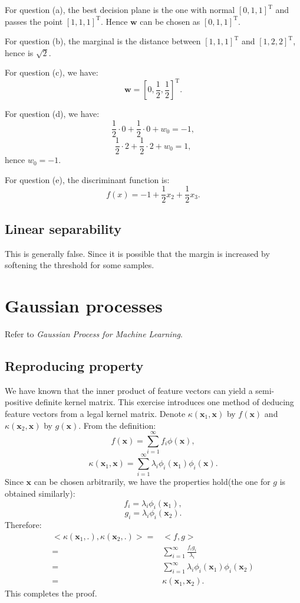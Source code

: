 \documentclass[UTF8]{ctexart}
\begin{document}
For question (a), the best decision plane is the one with normal $[0,1,1]^{\text{T}}$ and passes the point $[1,1,1]^{\text{T}}$.
Hence $\textbf{w}$ can be chosen as $[0,1,1]^{\text{T}}$.

For question (b), the marginal is the distance between $[1,1,1]^{\text{T}}$ and $[1,2,2]^{\text{T}}$, hence is $\sqrt{2}$.

For question (c), we have:
$$\textbf{w}=[0,\frac{1}{2},\frac{1}{2}]^{\text{T}}.$$

For question (d), we have:
$$\frac{1}{2}\cdot 0+\frac{1}{2}\cdot 0+w_{0}=-1,$$
$$\frac{1}{2}\cdot 2+\frac{1}{2}\cdot 2+w_{0}=1,$$
hence $w_{0}=-1$.

For question (e), the discriminant function is:
$$f(x)=-1+\frac{1}{2}x_{2}+\frac{1}{2}x_{3}.$$

\subsection{Linear separability}
This is generally false.
Since it is possible that the margin is increased by softening the threshold for some samples. 

\newpage
\section{Gaussian processes}
Refer to \emph{Gaussian Process for Machine Learning}.
\subsection{Reproducing property}
We have known that the inner product of feature vectors can yield a semi-positive definite kernel matrix. 
This exercise introduces one method of deducing feature vectors from a legal kernel matrix. 
Denote $\kappa(\textbf{x}_{1},\textbf{x})$ by $f(\textbf{x})$ and $\kappa(\textbf{x}_{2},\textbf{x})$ by $g(\textbf{x})$. 
From the definition:
$$f(\textbf{x})=\sum_{i=1}^{\infty}f_{i}\phi(\textbf{x}),$$
$$\kappa(\textbf{x}_{1},\textbf{x})=\sum_{i=1}^{\infty}\lambda_{i}\phi_{i}(\textbf{x}_{1})\phi_{i}(\textbf{x}).$$
Since $\textbf{x}$ can be chosen arbitrarily, we have the properties hold(the one for $g$ is obtained similarly):
$$f_{i}=\lambda_{i}\phi_{i}(\textbf{x}_{1}),$$
$$g_{i}=\lambda_{i}\phi_{i}(\textbf{x}_{2}).$$
Therefore:
\begin{align}
<\kappa(\textbf{x}_{1},.), \kappa(\textbf{x}_{2},.)> = & <f,g> \nonumber \\
=&\sum_{i=1}^{\infty}\frac{f_{i}g_{i}}{\lambda_{i}} \nonumber \\
=&\sum_{i=1}^{\infty}\lambda_{i}\phi_{i}(\textbf{x}_{1})\phi_{i}(\textbf{x}_{2}) \nonumber \\
=&\kappa(\textbf{x}_{1},\textbf{x}_{2}). \nonumber
\end{align}
This completes the proof. 
\end{document}
